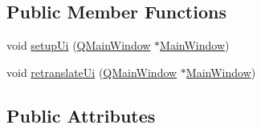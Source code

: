 \subsection*{Public Member Functions}
\begin{DoxyCompactItemize}
\item 
void \hyperlink{a00080_acf4a0872c4c77d8f43a2ec66ed849b58}{setup\+Ui} (\hyperlink{a00058}{Q\+Main\+Window} $\ast$\hyperlink{a00017}{Main\+Window})
\item 
void \hyperlink{a00080_a097dd160c3534a204904cb374412c618}{retranslate\+Ui} (\hyperlink{a00058}{Q\+Main\+Window} $\ast$\hyperlink{a00017}{Main\+Window})
\end{DoxyCompactItemize}
\subsection*{Public Attributes}
